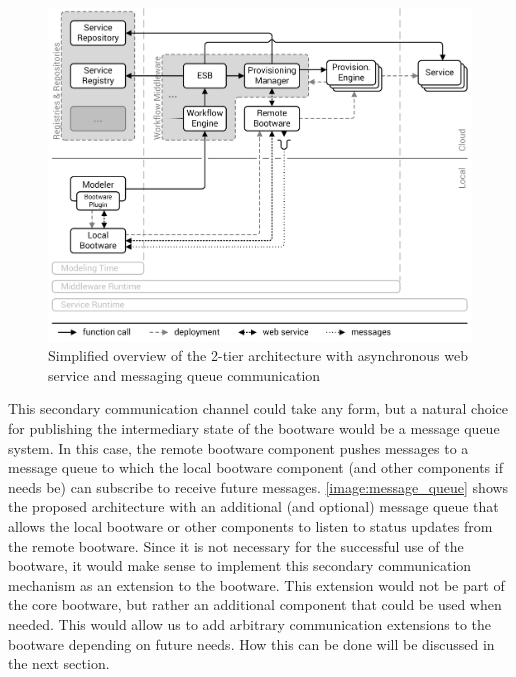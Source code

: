 \begin{figure}[!htbp]
	\centering
	\includegraphics[resolution=600]{design/assets/message_queue}
	\caption{Simplified overview of the 2-tier architecture with asynchronous web service and messaging queue communication}
	\label{image:message_queue}
\end{figure}

This secondary communication channel could take any form, but a natural choice for publishing the intermediary state of the bootware would be a message queue system.
In this case, the remote bootware component pushes messages to a message queue to which the local bootware component (and other components if needs be) can subscribe to receive future messages.
\autoref{image:message_queue} shows the proposed architecture with an additional (and optional) message queue that allows the local bootware or other components to listen to status updates from the remote bootware.
Since it is not necessary for the successful use of the bootware, it would make sense to implement this secondary communication mechanism as an extension to the bootware.
This extension would not be part of the core bootware, but rather an additional component that could be used when needed.
This would allow us to add arbitrary communication extensions to the bootware depending on future needs.
How this can be done will be discussed in the next section.
